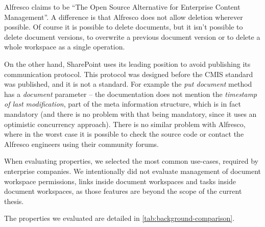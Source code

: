 Alfresco claims to be ``The Open Source Alternative for Enterprise Content
Management''. \cite{alfwiki} A difference is that Alfresco does not allow
deletion wherever possible. Of course it is possible to delete documents, but
it isn't possible to delete document versions, to overwrite a previous document
version or to delete a whole workspace as a single operation.

On the other hand, SharePoint uses its leading position to avoid publishing its
communication protocol. This protocol was designed before the CMIS standard was
published, and it is not a standard. For example the \emph{put document} method
has a \emph{document} parameter -- the documentation \cite{spdoc} does not
mention the \emph{timestamp of last modification}, part of the meta information
structure, which is in fact mandatory (and there is no problem with that being
mandatory, since it uses an optimistic concurrency approach). There is no
similar problem with Alfresco, where in the worst case it is possible to check the
source code or contact the Alfresco engineers using their community forums.

When evaluating properties, we selected the most common use-cases, required by
enterprise companies. We intentionally did not evaluate management of document
workspace permissions, links inside document workspaces and tasks inside
document workspaces, as those features are beyond the scope of the current
thesis.

The properties we evaluated are detailed in
\autoref{tab:background-comparison}.

